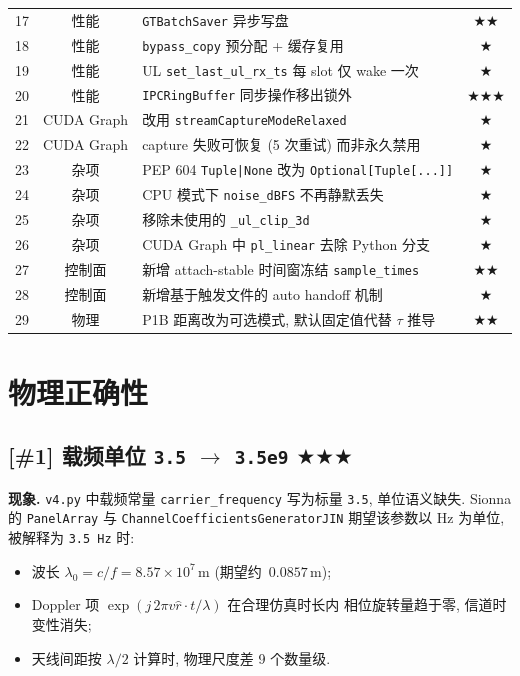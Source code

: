 \documentclass[11pt,a4paper,UTF8,fontset=fandol]{ctexart}
\newcommand{\sone}{\textcolor{starcolor}{$\bigstar$}}
\newcommand{\stwo}{\textcolor{starcolor}{$\bigstar\bigstar$}}
\newcommand{\sthree}{\textcolor{starcolor}{$\bigstar\bigstar\bigstar$}}
\newcommand{\vfour}{\texttt{v4.py}}
\newcommand{\bugitem}[3]{%
  \subsection{[\##1] #2 \hfill #3}%
  \vspace{-0.5em}%
}
\begin{document}
\begin{center}
\begin{longtable}{c c p{8.6cm} c}
17 & 性能 & \texttt{GTBatchSaver} 异步写盘                                     & \stwo   \\
18 & 性能 & \texttt{bypass\_copy} 预分配 + 缓存复用                            & \sone   \\
19 & 性能 & UL \texttt{set\_last\_ul\_rx\_ts} 每 slot 仅 wake 一次             & \sone   \\
20 & 性能 & \texttt{IPCRingBuffer} 同步操作移出锁外                            & \sthree \\
21 & CUDA Graph & 改用 \texttt{streamCaptureModeRelaxed}                       & \sone   \\
22 & CUDA Graph & capture 失败可恢复 (5 次重试) 而非永久禁用                   & \sone   \\
23 & 杂项 & PEP 604 \texttt{Tuple|None} 改为 \texttt{Optional[Tuple[...]]}    & \sone   \\
24 & 杂项 & CPU 模式下 \texttt{noise\_dBFS} 不再静默丢失                       & \sone   \\
25 & 杂项 & 移除未使用的 \texttt{\_ul\_clip\_3d}                               & \sone   \\
26 & 杂项 & CUDA Graph 中 \texttt{pl\_linear} 去除 Python 分支                 & \sone   \\
\midrule
27 & 控制面 & 新增 attach-stable 时间窗冻结 \texttt{sample\_times}              & \stwo   \\
28 & 控制面 & 新增基于触发文件的 auto handoff 机制                              & \sone   \\
29 & 物理 & P1B 距离改为可选模式, 默认固定值代替 $\tau$ 推导                   & \stwo   \\
\end{longtable}
\end{center}

\section{物理正确性}
\label{sec:physics}

\bugitem{1}{载频单位 \texttt{3.5} $\to$ \texttt{3.5e9}}{\sthree}

\textbf{现象.} \vfour{} 中载频常量 \texttt{carrier\_frequency} 写为标量
\texttt{3.5}, 单位语义缺失. Sionna 的 \texttt{PanelArray} 与
\texttt{ChannelCoefficientsGeneratorJIN} 期望该参数以 Hz 为单位,
被解释为 \texttt{3.5\,Hz} 时:
\begin{itemize}
  \item 波长 $\lambda_0 = c/f = 8.57\times 10^{7}\,\text{m}$
        (期望约 \,$0.0857\,\text{m}$);
  \item Doppler 项 $\exp(j\,2\pi v \hat{r}\cdot t / \lambda)$ 在合理仿真时长内
        相位旋转量趋于零, 信道时变性消失;
  \item 天线间距按 $\lambda/2$ 计算时, 物理尺度差 9 个数量级.
\end{itemize}
\end{document}
